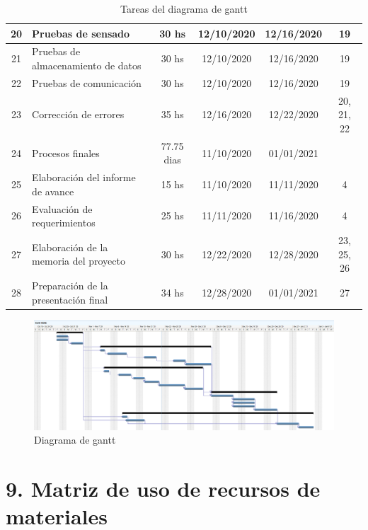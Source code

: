 \documentclass[11pt]{charter}
\begin{document}
\begin{table}[htpb]
\begin{tabularx}{\linewidth}{@{}|c|X|c|c|c|c|@{}}
20 & Pruebas de sensado &  30 hs & 12/10/2020 & 	12/16/2020 & 19\\ \hline
21 & Pruebas de almacenamiento de datos & 30 hs & 12/10/2020 & 	12/16/2020 &19\\ \hline
22 & Pruebas de comunicación & 30 hs & 12/10/2020 & 	12/16/2020 & 19\\ \hline
23 & Corrección de errores &  35 hs & 12/16/2020 & 	12/22/2020 &20, 21, 22\\ \hline
24 & Procesos finales &  77.75 dias & 11/10/2020 & 	01/01/2021 & \\ \hline
25 & Elaboración del informe de avance &  15 hs & 11/10/2020 & 	11/11/2020 & 4\\ \hline
26 & Evaluación de requerimientos &  25 hs & 11/11/2020 & 	11/16/2020 & 4\\ \hline
27 & Elaboración de la memoria del proyecto &  30 hs & 12/22/2020 & 	12/28/2020 & 23, 25, 26\\ \hline
28 & Preparación de la presentación final &  34 hs &12/28/2020 & 	01/01/2021 &  27\\ 
\hline
\end{tabularx}%
\caption{Tareas del diagrama de gantt}
\label{tab:gantt}
\end{table}

\begin{figure}[htpb]
\centering 
\includegraphics[width=1.4\textwidth, angle =90 ]{./Figuras/gant.png}
\caption{Diagrama de gantt}
\label{fig:gantt}
\end{figure}

\section{9. Matriz de uso de recursos de materiales}
\label{sec:recursos}
\end{document}
